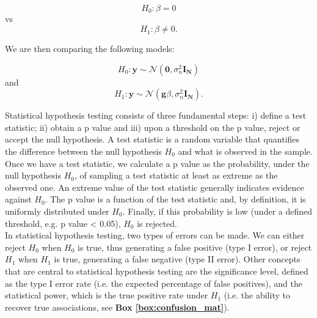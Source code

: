 \begin{equation}\label{eq:null_hypothesis}
 H_{0}: \beta=0 
\end{equation}
vs
\begin{equation}\label{eq:alternative_hypothesis}
 H_{1}: \beta \neq 0. 
\end{equation}

\vspace{4mm}

We are then comparing the following models:

\begin{equation}\label{eq:null_hypothesis_regression}
 H_0: \mathbf{y} \sim \mathcal{N}(\mathbf{0}, \sigma_n^{2} \mathbf{I_N}) 
\end{equation}
and
\begin{equation}\label{eq:alternative_hypothesis_regression}
 H_1: \mathbf{y} \sim \mathcal{N}(\mathbf{g}\beta,\sigma_n^{2} \mathbf{I_N}). 
\end{equation}

\vspace{4mm}

Statistical hypothesis testing consists of three fundamental steps: i) define a test statistic; ii) obtain a p value and iii) upon a threshold on the p value, reject or accept the null hypothesis. 
A test statistic is a random variable that quantifies the difference between the null hypothesis $H_0$ and what is observed in the sample. 
Once we have a test statistic, we calculate a p value as the probability, under the null hypothesis $H_0$, of sampling a test statistic at least as extreme as the observed one. 
An extreme value of the test statistic generally indicates evidence against $H_0$.
The p value is a function of the test statistic and, by definition, it is uniformly distributed under $H_0$.
Finally, if this probability is low (under a defined threshold, e.g. p value < 0.05), $H_0$ is rejected.\\

In statistical hypothesis testing, two types of errors can be made. 
We can either reject $H_0$ when $H_0$ is true, thus generating a false positive (type I error), or reject $H_1$ when $H_1$ is true, generating a false negative (type II error).
Other concepts that are central to statistical hypothesis testing are the significance level, defined as the type I error rate (i.e. the expected percentage of false positives), and the statistical power, which is the true positive rate under $H_1$ (i.e. the ability to recover true associations, see \textbf{Box \ref{box:confusion_mat}}).

